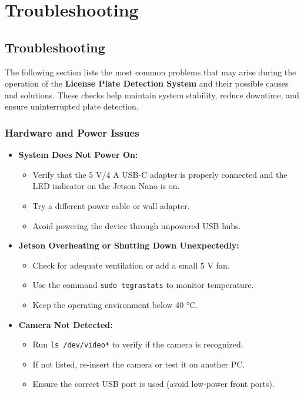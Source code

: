 %
%

\chapter{Troubleshooting}
\section{Troubleshooting}

The following section lists the most common problems that may arise during the operation of the \textbf{License Plate Detection System} and their possible causes and solutions.  
These checks help maintain system stability, reduce downtime, and ensure uninterrupted plate detection.

\subsection{Hardware and Power Issues}

\begin{itemize}
	\item \textbf{System Does Not Power On:}  
	\begin{itemize}
		\item Verify that the 5 V/4 A USB-C adapter is properly connected and the LED indicator on the Jetson Nano is on.  
		\item Try a different power cable or wall adapter.  
		\item Avoid powering the device through unpowered USB hubs.
	\end{itemize}
	
	\item \textbf{Jetson Overheating or Shutting Down Unexpectedly:}  
	\begin{itemize}
		\item Check for adequate ventilation or add a small 5 V fan.  
		\item Use the command \texttt{sudo tegrastats} to monitor temperature.  
		\item Keep the operating environment below 40 °C.
	\end{itemize}
	
	\item \textbf{Camera Not Detected:}  
	\begin{itemize}
		\item Run \texttt{ls /dev/video*} to verify if the camera is recognized.  
		\item If not listed, re-insert the camera or test it on another PC.  
		\item Ensure the correct USB port is used (avoid low-power front ports).
	\end{itemize}
\end{itemize}

